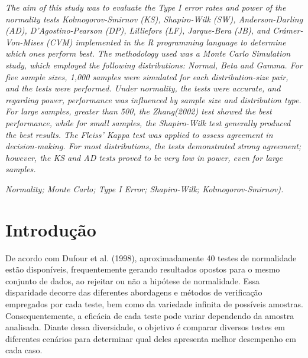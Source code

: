 \documentclass[a4paper,11pt]{article} %
\begin{document}
\begin{small}

 {\it 
    The aim of this study was to evaluate the Type I error rates and power of the normality tests Kolmogorov-Smirnov (KS), Shapiro-Wilk (SW), Anderson-Darling (AD), D'Agostino-Pearson (DP), Lilliefors (LF), Jarque-Bera (JB), and Crámer-Von-Mises (CVM) implemented in the R programming language to determine which ones perform best. The methodology used was a Monte Carlo Simulation study, which employed the following distributions: Normal, Beta and Gamma. For five sample sizes, 1,000 samples were simulated for each distribution-size pair, and the tests were performed. Under normality, the tests were accurate, and regarding power, performance was influenced by sample size and distribution type. For large samples, greater than 500, the \textit{Zhang(2002)} test showed the best performance, while for small samples, the Shapiro-Wilk test generally produced the best results. The Fleiss' Kappa test was applied to assess agreement in decision-making. For most distributions, the tests demonstrated strong agreement; however, the KS and AD tests proved to be very low in power, even for large samples.}\vspace{0.3cm}

  {\it Normality; Monte Carlo; Type I Error; Shapiro-Wilk; Kolmogorov-Smirnov).\vspace{0.3cm}}

\end{small}
\newpage                                                                                   
\pagestyle{fancy}                                                                          
\renewcommand{\thefootnote}{\roman{footnote}}                                              
\lhead{}
\chead{\small \slshape}
\rhead{\thepage}
\lfoot{}
\rfoot{}

\section{Introdução}

De acordo com Dufour et al. (1998), aproximadamente 40 testes de normalidade estão disponíveis, frequentemente gerando resultados opostos para o mesmo conjunto de dados, ao rejeitar ou não a hipótese de normalidade. Essa disparidade decorre das diferentes abordagens e métodos de verificação empregados por cada teste, bem como da variedade infinita de possíveis amostras. Consequentemente, a eficácia de cada teste pode variar dependendo da amostra analisada. Diante dessa diversidade, o objetivo é comparar diversos testes em diferentes cenários para determinar qual deles apresenta melhor desempenho em cada caso.\vskip0.3cm
\end{document}
